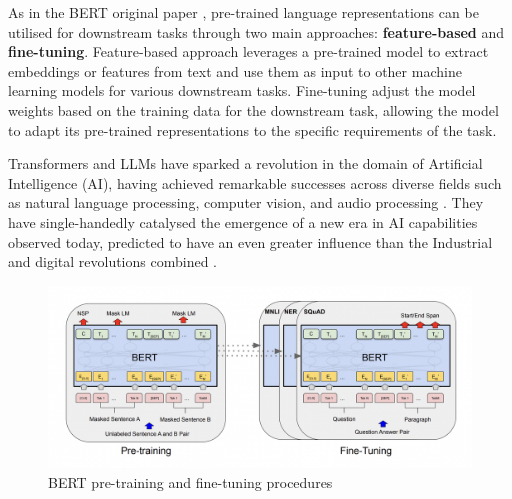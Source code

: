 As in the BERT original paper \cite{devlin-2019-bert}, pre-trained language representations can be utilised for downstream tasks through two main approaches: \textbf{feature-based} and \textbf{fine-tuning}. Feature-based approach \cite{devlin-2019-bert} leverages a pre-trained model to extract embeddings or features from text and use them as input to other machine learning models for various downstream tasks. Fine-tuning \cite{devlin-2019-bert} adjust the model weights based on the training data for the downstream task, allowing the model to adapt its pre-trained representations to the specific requirements of the task.

Transformers and LLMs have sparked a revolution in the domain of Artificial Intelligence (AI), having achieved remarkable successes across diverse fields such as natural language processing, computer vision, and audio processing \cite{lin-2022-survey-transformers}. They have single-handedly catalysed the emergence of a new era in AI capabilities observed today, predicted to have an even greater influence than the Industrial and digital revolutions combined \cite{makridakis-2017-ai-revolution}.

\begin{figure}[htbp]
    \centering
    \includegraphics[width=0.9\linewidth]{images/bert_finetuning.png}
    \caption{BERT pre-training and fine-tuning procedures \cite{devlin-2019-bert}}
    \label{fig:bert_finetuning}
\end{figure}

